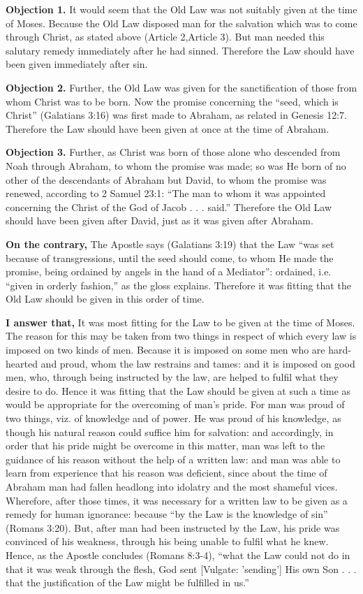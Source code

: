 
\textbf{Objection 1.} It would seem that the Old Law was not suitably given at the time of Moses. Because the Old Law disposed man for the salvation which was to come through Christ, as stated above (Article 2,Article 3). But man needed this salutary remedy immediately after he had sinned. Therefore the Law should have been given immediately after sin.

\textbf{Objection 2.} Further, the Old Law was given for the sanctification of those from whom Christ was to be born. Now the promise concerning the ``seed, which is Christ'' (Galatians 3:16) was first made to Abraham, as related in Genesis 12:7. Therefore the Law should have been given at once at the time of Abraham.

\textbf{Objection 3.} Further, as Christ was born of those alone who descended from Noah through Abraham, to whom the promise was made; so was He born of no other of the descendants of Abraham but David, to whom the promise was renewed, according to 2 Samuel 23:1: ``The man to whom it was appointed concerning the Christ of the God of Jacob . . . said.'' Therefore the Old Law should have been given after David, just as it was given after Abraham.

\textbf{On the contrary,} The Apostle says (Galatians 3:19) that the Law ``was set because of transgressions, until the seed should come, to whom He made the promise, being ordained by angels in the hand of a Mediator'': ordained, i.e. ``given in orderly fashion,'' as the gloss explains. Therefore it was fitting that the Old Law should be given in this order of time.

\textbf{I answer that,} It was most fitting for the Law to be given at the time of Moses. The reason for this may be taken from two things in respect of which every law is imposed on two kinds of men. Because it is imposed on some men who are hard-hearted and proud, whom the law restrains and tames: and it is imposed on good men, who, through being instructed by the law, are helped to fulfil what they desire to do. Hence it was fitting that the Law should be given at such a time as would be appropriate for the overcoming of man's pride. For man was proud of two things, viz. of knowledge and of power. He was proud of his knowledge, as though his natural reason could suffice him for salvation: and accordingly, in order that his pride might be overcome in this matter, man was left to the guidance of his reason without the help of a written law: and man was able to learn from experience that his reason was deficient, since about the time of Abraham man had fallen headlong into idolatry and the most shameful vices. Wherefore, after those times, it was necessary for a written law to be given as a remedy for human ignorance: because ``by the Law is the knowledge of sin'' (Romans 3:20). But, after man had been instructed by the Law, his pride was convinced of his weakness, through his being unable to fulfil what he knew. Hence, as the Apostle concludes (Romans 8:3-4), ``what the Law could not do in that it was weak through the flesh, God sent [Vulgate: 'sending'] His own Son . . . that the justification of the Law might be fulfilled in us.''

